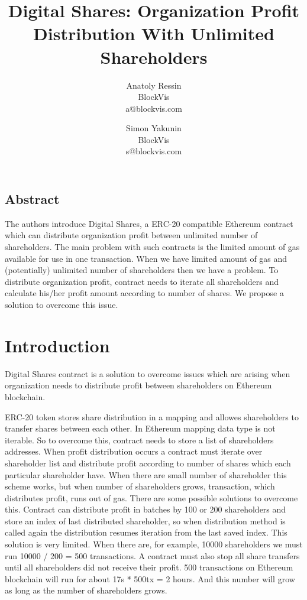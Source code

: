 \documentclass[onecolumn]{article}
\begin{document}
\title{Digital Shares: Organization Profit Distribution With Unlimited Shareholders}

\author{
{\rm Anatoly Ressin}\\
BlockVis\\
a@blockvis.com
\and
{\rm Simon Yakunin}\\
BlockVis\\
s@blockvis.com
}

\maketitle

\subsection*{Abstract}
The authors introduce Digital Shares, a ERC-20  compatible Ethereum contract which can distribute organization profit between unlimited number of shareholders. The main problem with such contracts is the limited amount of gas available for use in one transaction. When we have limited amount of gas and (potentially) unlimited number of shareholders then we have a problem. To distribute organization profit, contract needs to iterate all shareholders and calculate his/her profit amount according to number of shares. We propose a solution to overcome this issue.

\section{Introduction}
Digital Shares contract is a solution to overcome issues which are arising when organization needs to distribute profit between shareholders on Ethereum  \cite{ethereum} blockchain.

ERC-20 \cite{erc20} token stores share distribution in a mapping and allowes shareholders to transfer shares between each other. In Ethereum mapping data type is not iterable. So to overcome this, contract needs to store a list of shareholders addresses. When profit distribution occurs a contract must iterate over shareholder list and distribute profit according to number of shares which each particular shareholder have. When there are small number of shareholder this scheme works, but when number of shareholders grows, transaction, which distributes profit, runs out of gas. There are some possible solutions to overcome this. Contract can distribute profit in batches by 100 or 200 shareholders and store an index of last distributed shareholder, so when distribution method is called again the distribution resumes iteration from the last saved index. This solution is very limited. When there are, for example, 10000 shareholders we must run 10000 / 200 = 500 transactions. A contract must also stop all share transfers until all shareholders did not receive their profit. 500 transactions on Ethereum blockchain will run for about 17s * 500tx = 2 hours. And this number will grow as long as the number of shareholders grows.
\end{document}
